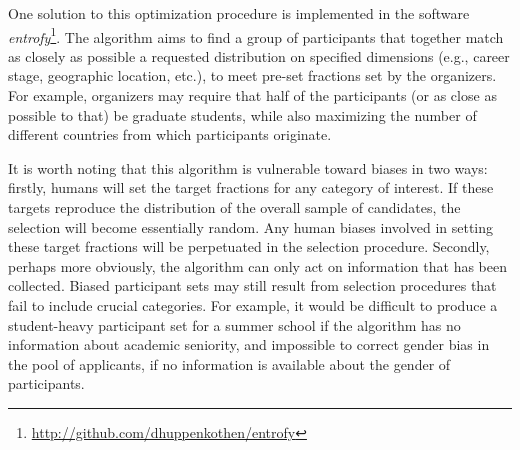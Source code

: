 One solution to this optimization procedure is implemented in the software \textit{entrofy}\footnote{\url{http://github.com/dhuppenkothen/entrofy}}. The algorithm aims to find a group of participants that together match as closely as possible a requested distribution on specified dimensions (e.g., career stage, geographic location, etc.), to meet pre-set fractions set by the organizers.
For example, organizers may require that half of the participants (or as close as possible to that) be graduate students, while also maximizing the number of different countries from which participants originate.

It is worth noting that this algorithm is vulnerable toward biases in two ways: firstly, humans will set the target fractions for any category of interest.
If these targets reproduce the distribution of the overall sample of candidates, the selection will become essentially random.
Any human biases involved in setting these target fractions will be perpetuated in the selection procedure.
Secondly, perhaps more obviously, the algorithm can only act on information that has been collected.
Biased participant sets may still result from selection procedures that fail to include crucial categories. For example, it would be difficult to produce a student-heavy participant set for a summer school if the algorithm has no information about academic seniority, and impossible to correct gender bias in the pool of applicants, if no information is available about the gender of participants.
